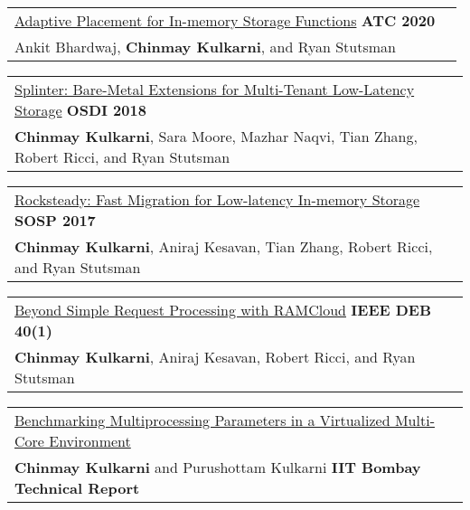 \documentclass[margin,line]{res}
\begin{document}
\begin{resume}
 \vspace{-7pt}
 \begin{tabular}{@{}p{5.5in}p{4in}}
 \href{http://utah.systems/projects/kulkarni\_splinter}{Adaptive
 Placement for In-memory Storage Functions} \hfill
 {\small\bf ATC 2020}\\
 {\small Ankit Bhardwaj, {\bf Chinmay Kulkarni}, and Ryan Stutsman}\\
 \end{tabular}

 \vspace{-7pt}
 \begin{tabular}{@{}p{5.5in}p{4in}}
 \href{http://utah.systems/projects/kulkarni\_splinter}{Splinter:
 Bare-Metal Extensions for Multi-Tenant Low-Latency Storage} \hfill
 {\small\bf OSDI 2018}\\
 {\small{\bf Chinmay Kulkarni}, Sara Moore, Mazhar Naqvi, Tian Zhang, Robert
 Ricci, and Ryan Stutsman}\\
 \end{tabular}

 \vspace{-7pt}
 \begin{tabular}{@{}p{5.5in}p{4in}}
 \href{http://utah.systems/projects/kulkarni\_rocksteady}{Rocksteady: Fast
 Migration for Low-latency In-memory Storage} \hfill
 {\small\bf SOSP 2017}\\
 {\small{\bf Chinmay Kulkarni}, Aniraj Kesavan, Tian Zhang, Robert
 Ricci, and Ryan Stutsman}\\
 \end{tabular}

\vspace{-7pt}
\begin{tabular}{@{}p{5.5in}p{4in}}
\href{http://sites.computer.org/debull/A17mar/p62.pdf}{Beyond Simple
Request Processing with RAMCloud} \hfill
{\small\bf IEEE DEB 40(1)}\\
{\small {\bf Chinmay Kulkarni}, Aniraj Kesavan, Robert Ricci, and Ryan
Stutsman}\\
\end{tabular}

\vspace{-7pt}
\begin{tabular}{@{}p{5.5in}p{4in}}
\href{https://chinkulkarni.github.io/public/TR-CSE-2015-76.pdf}
{Benchmarking Multiprocessing Parameters in a Virtualized Multi-Core
Environment}\\
{\small{\bf Chinmay Kulkarni} and Purushottam Kulkarni} \hfill
{\small\bf IIT Bombay Technical Report}\\
\end{tabular}


\end{resume}
\end{document}
